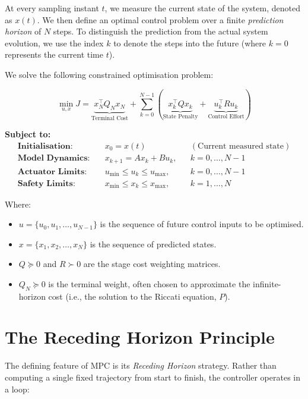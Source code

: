 At every sampling instant $t$, we measure the current state of the system, denoted as $x(t)$. We then define an optimal control problem over a finite \emph{prediction horizon} of $N$ steps. To distinguish the prediction from the actual system evolution, we use the index $k$ to denote the steps into the future (where $k=0$ represents the current time $t$).

We solve the following constrained optimisation problem:

\begin{equation} \label{eq:mpc_cost}
	\min_{{u}, {x}} J = \underbrace{x_N^\top Q_N x_N}_{\text{Terminal Cost}} + \sum_{k=0}^{N-1} \left( \underbrace{x_k^\top Q x_k}_{\text{State Penalty}} + \underbrace{u_k^\top R u_k}_{\text{Control Effort}} \right)
\end{equation}

\textbf{Subject to:}
\begin{align*}
	\textbf{Initialisation:} \quad & x_0 = x(t) && (\text{Current measured state}) \\
	\textbf{Model Dynamics:} \quad & x_{k+1} = A x_k + B u_k, && k=0,\dots,N-1 \\
	\textbf{Actuator Limits:} \quad & u_{\min} \le u_k \le u_{\max}, && k=0,\dots,N-1 \\
	\textbf{Safety Limits:} \quad & x_{\min} \le x_k \le x_{\max}, && k=1,\dots,N
\end{align*}

Where:
\begin{itemize}
	\item ${u} = \{u_0, u_1, \dots, u_{N-1}\}$ is the sequence of future control inputs to be optimised.
	\item ${x} = \{x_1, x_2, \dots, x_N\}$ is the sequence of predicted states.
	\item $Q \succeq 0$ and $R \succ 0$ are the stage cost weighting matrices.
	\item $Q_N \succeq 0$ is the terminal weight, often chosen to approximate the infinite-horizon cost (i.e., the solution to the Riccati equation, $P$).
\end{itemize}

\section{The Receding Horizon Principle}
The defining feature of MPC is its \emph{Receding Horizon} strategy. Rather than computing a single fixed trajectory from start to finish, the controller operates in a loop:

